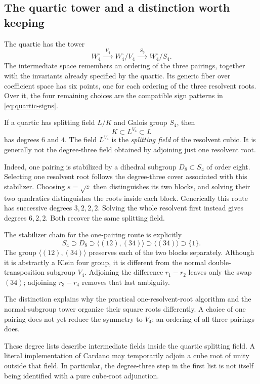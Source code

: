 \documentclass[11pt]{article}
\theoremstyle{remark}
\begin{document}
\subsection{The quartic tower and a distinction worth keeping}

The quartic has the tower
\begin{equation}
W_4^\circ\ \xrightarrow{\ V_4\ }\ W_4^\circ/V_4
\ \xrightarrow{\ S_3\ }\ W_4^\circ/S_4.
\label{eq:quartic-cover}
\end{equation}
The intermediate space remembers an ordering of the three pairings, together with the invariants already specified by the quartic. Its generic fiber over coefficient space has six points, one for each ordering of the three resolvent roots. Over it, the four remaining choices are the compatible sign patterns in \eqref{eq:quartic-signs}.

If a quartic has splitting field \(L/K\) and Galois group \(S_4\), then
\[
K\subset L^{V_4}\subset L
\]
has degrees \(6\) and \(4\). The field \(L^{V_4}\) is the \emph{splitting field} of the resolvent cubic. It is generally not the degree-three field obtained by adjoining just one resolvent root.

Indeed, one pairing is stabilized by a dihedral subgroup \(D_8\subset S_4\) of order eight. Selecting one resolvent root follows the degree-three cover associated with this stabilizer. Choosing \(s=\sqrt z\) then distinguishes its two blocks, and solving their two quadratics distinguishes the roots inside each block. Generically this route has successive degrees \(3,2,2,2\). Solving the whole resolvent first instead gives degrees \(6,2,2\). Both recover the same splitting field.

The stabilizer chain for the one-pairing route is explicitly
\[
S_4\supset D_8\supset\langle(12),(34)\rangle
\supset\langle(34)\rangle\supset\{1\}.
\]
The group \(\langle(12),(34)\rangle\) preserves each of the two blocks separately. Although it is abstractly a Klein four group, it is different from the normal double-transposition subgroup \(V_4\). Adjoining the difference \(r_1-r_2\) leaves only the swap \((34)\); adjoining \(r_3-r_4\) removes that last ambiguity.

The distinction explains why the practical one-resolvent-root algorithm and the normal-subgroup tower organize their square roots differently. A choice of one pairing does not yet reduce the symmetry to \(V_4\); an ordering of all three pairings does.

These degree lists describe intermediate fields inside the quartic splitting field. A literal implementation of Cardano may temporarily adjoin a cube root of unity outside that field. In particular, the degree-three step in the first list is not itself being identified with a pure cube-root adjunction.
\end{document}
